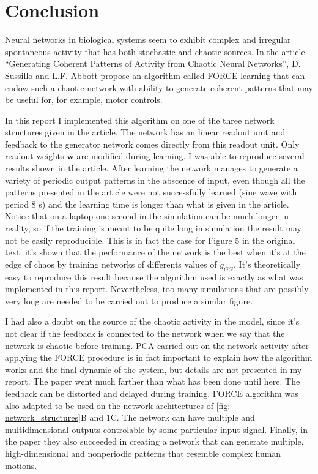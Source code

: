 \section{Conclusion}

Neural networks in biological systems seem to exhibit complex and
irregular spontaneous activity that has both stochastic and chaotic sources.
In the article ``Generating Coherent Patterns of Activity from
Chaotic Neural Networks'', D. Sussillo and L.F. Abbott propose an 
algorithm called FORCE learning that can endow such
a chaotic network with ability to generate coherent patterns that
may be useful for, for example, motor controls.

In this report I implemented this algorithm on one of the three
network structures given in the article. The network has an linear readout
unit and feedback to the generator network comes directly from this
readout unit. Only readout weights $\mathbf{w}$ are modified during learning.
I was able to reproduce several results shown in the article. After
learning the network manages to generate a variety of periodic
output patterns in the abscence of input, even though all the patterns
presented in the article were not successfully learned 
(sine wave with period 8 s) and the learning time is longer than what
is given in the article. Notice that on a laptop one second in the 
simulation can be much longer in reality, so if the training is meant
to be quite long in simulation the result may not be easily reproducible.
This is in fact the case for Figure 5 in the original text: it's shown
that the performance of the network is the best when it's at the
edge of chaos by training networks of differents values of $g_{GG}$.
It's theoretically easy to reproduce this result because the algorithm
used is exactly as what was implemented in this report. Nevertheless,
too many simulations that are possibly very long are needed to be
carried out to produce a similar figure.

I had also a doubt on the source of the chaotic activity in the model,
since it's not clear if the feedback is connected to the network 
when we say that the network is chaotic before training. PCA carried out on 
the network activity after applying the FORCE procedure is in fact important
to explain how the algorithm works and the final dynamic of the system,
but details are not presented in my report. The paper went much farther
than what has been done until here. The feedback can be distorted and
delayed during training. FORCE algorithm was also adapted
to be used on the network architectures of \autoref{fig: network_structures}B
and 1C. The network can have multiple and multidimensional outputs 
controlable by some particular input signal. Finally, in the paper they
also succeeded in creating a network that can generate multiple,
high-dimensional and nonperiodic patterns that resemble complex human motions.

